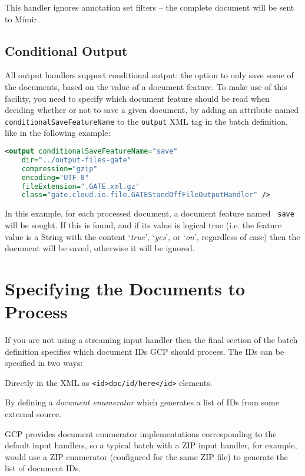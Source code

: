 This handler ignores annotation set filters -- the complete document will be
sent to M\'{i}mir.

\subsection{Conditional Output}\label{sec:batch-def:conditional-output}
All output handlers support conditional output: the option to only save
some of the documents, based on the value of a document feature. To make use of
this facility, you need to specify which document feature should be read when
deciding whether or not to save a given document, by adding an attribute named
\verb!conditionalSaveFeatureName! to the \verb!output! XML tag in the batch
definition, like in the following example:

\begin{lstlisting}[language=XML]
<output conditionalSaveFeatureName="save"
    dir="../output-files-gate"
    compression="gzip"
    encoding="UTF-8"
    fileExtension=".GATE.xml.gz"
    class="gate.cloud.io.file.GATEStandOffFileOutputHandler" />
\end{lstlisting}

In this example, for each processed document, a document feature named {\tt
save} will be sought. If this is found, and if its value is logical true (i.e.
the feature value is a String with the content `{\it true}', `{\it yes}', or
`{\it on}', regardless of case) then the document will be saved, otherwise it
will be ignored.

\section{Specifying the Documents to Process}

If you are not using a streaming input handler then the final section of the
batch definition specifies which document IDs GCP should process.  The IDs can
be specified in two ways:

\bit
\item Directly in the XML as \verb!<id>doc/id/here</id>! elements.
\item By defining a {\em document enumerator} which generates a list of IDs
  from some external source.
\eit

GCP provides document enumerator implementations corresponding to the default
input handlers, so a typical batch with a ZIP input handler, for example, would
use a ZIP enumerator (configured for the same ZIP file) to generate the list of
document IDs.

